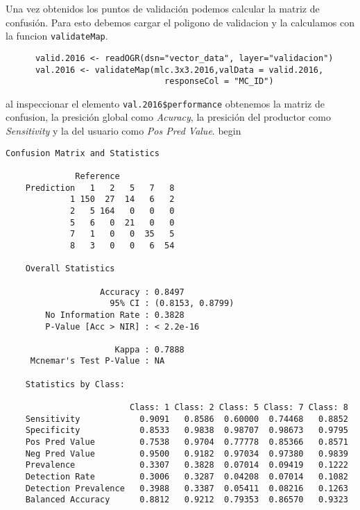 \begin{exa}

  Una vez obtenidos los puntos de validaci\'on podemos calcular la matriz de confusi\'on.
  Para esto debemos cargar el poligono de validacion y la calculamos con la
  funcion \texttt{validateMap}.

  \begin{lstlisting}
      valid.2016 <- readOGR(dsn="vector_data", layer="validacion")
      val.2016 <- validateMap(mlc.3x3.2016,valData = valid.2016,
                                responseCol = "MC_ID")
  \end{lstlisting}

  al inspeccionar el elemento \verb|val.2016$performance| obtenemos la matriz
  de confusion, la presici\'on global como \emph{Acuracy}, la presici\'on del
  productor como \emph{Sensitivity} y la del usuario como \emph{Pos Pred Value}.
  begin

  \begin{Verbatim}[fontsize=\small]
    Confusion Matrix and Statistics

              Reference
    Prediction   1   2   5   7   8
             1 150  27  14   6   2
             2   5 164   0   0   0
             5   6   0  21   0   0
             7   1   0   0  35   5
             8   3   0   0   6  54

    Overall Statistics

                   Accuracy : 0.8497
                     95% CI : (0.8153, 0.8799)
        No Information Rate : 0.3828
        P-Value [Acc > NIR] : < 2.2e-16

                      Kappa : 0.7888
     Mcnemar's Test P-Value : NA

    Statistics by Class:

                         Class: 1 Class: 2 Class: 5 Class: 7 Class: 8
    Sensitivity            0.9091   0.8586  0.60000  0.74468   0.8852
    Specificity            0.8533   0.9838  0.98707  0.98673   0.9795
    Pos Pred Value         0.7538   0.9704  0.77778  0.85366   0.8571
    Neg Pred Value         0.9500   0.9182  0.97034  0.97380   0.9839
    Prevalence             0.3307   0.3828  0.07014  0.09419   0.1222
    Detection Rate         0.3006   0.3287  0.04208  0.07014   0.1082
    Detection Prevalence   0.3988   0.3387  0.05411  0.08216   0.1263
    Balanced Accuracy      0.8812   0.9212  0.79353  0.86570   0.9323
  \end{Verbatim}


\end{exa}
